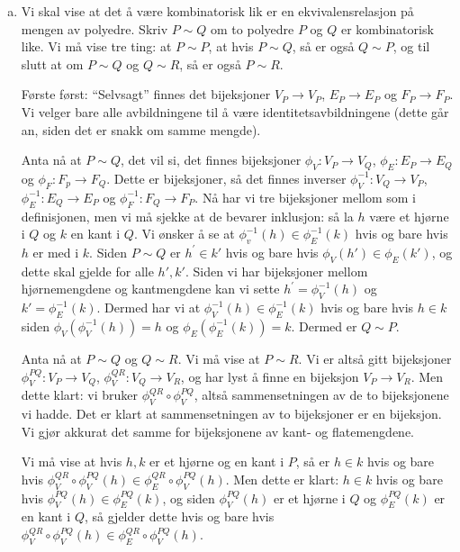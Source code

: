 \documentclass[11pt, norsk]{article}
\begin{document}
\begin{losn}
  \begin{enumerate}[a)]
  \item Vi skal vise at det å være kombinatorisk lik er en ekvivalensrelasjon på mengen av polyedre. Skriv $P \sim Q$ om to polyedre $P$ og $Q$ er kombinatorisk like. Vi må vise tre ting: at $P \sim P$, at hvis $P \sim Q$, så er også $Q \sim P$, og til slutt at om $P \sim Q$ og $Q \sim R$, så er også $P \sim R$.

Første først: ``Selvsagt'' finnes det bijeksjoner $V_P \to V_P$, $E_P \to E_P$ og $F_P \to F_P$. Vi velger bare alle avbildningene til å være identitetsavbildningene (dette går an, siden det er snakk om samme mengde).

Anta nå at $P \sim Q$, det vil si, det finnes bijeksjoner $\phi_V:V_P \to V_Q$, $\phi_E:E_P \to E_Q$ og $\phi_F:F_p \to F_Q$. Dette er bijeksjoner, så det finnes inverser $\phi_V^{-1}:V_Q \to V_P$, $\phi_E^{-1}:E_Q \to E_P$ og $\phi_F^{-1}:F_Q \to F_P$. Nå har vi tre bijeksjoner mellom som i definisjonen, men vi må sjekke at de bevarer inklusjon: så la $h$ være et hjørne i $Q$ og $k$ en kant i $Q$. Vi ønsker å se at $\phi_v^{-1}(h) \in \phi_E^{-1}(k)$ hvis og bare hvis $h$ er med i $k$. Siden $P \sim Q$ er $h^\prime \in k'$ hvis og bare hvis $\phi_V(h') \in \phi_E(k')$, og dette skal gjelde for alle $h',k'$. Siden vi har bijeksjoner mellom hjørnemengdene og kantmengdene kan vi sette $h^\prime = \phi_V^{-1}(h)$ og $k' = \phi_E^{-1}(k)$. Dermed har vi at $\phi_V^{-1}(h) \in \phi_E^{-1}(k)$ hvis og bare hvis $h \in k$ siden $\phi_V(\phi_V^{-1}(h))=h$ og $\phi_E(\phi_E^{-1}(k))=k$. Dermed er $Q \sim P$.

Anta nå at $P \sim Q$ og $Q \sim R$. Vi må vise at $P \sim R$. Vi er altså gitt bijeksjoner $\phi_V^{PQ}:V_P \to V_Q$, $\phi_V^{QR}:V_Q \to V_R$, og har lyst å finne en bijeksjon $V_P \to V_R$. Men dette klart: vi bruker $\phi_V^{QR} \circ \phi_V^{PQ}$, altså sammensetningen av de to bijeksjonene vi hadde. Det er klart at sammensetningen av to bijeksjoner er en bijeksjon. Vi gjør akkurat det samme for bijeksjonene av kant- og flatemengdene.

Vi må vise at hvis $h,k$ er et hjørne og en kant i $P$, så er $h \in k$ hvis og bare hvis $\phi_V^{QR} \circ \phi_V^{PQ}(h) \in \phi_E^{QR} \circ \phi_V^{PQ}(h)$. Men dette er klart: $h \in k$ hvis og bare hvis $\phi_V^{PQ}(h) \in \phi_E^{PQ}(k)$, og siden $\phi_V^{PQ}(h)$ er et hjørne i $Q$ og $\phi_E^{PQ}(k)$ er en kant i $Q$, så gjelder dette hvis og bare hvis $\phi_V^{QR} \circ \phi_V^{PQ}(h) \in \phi_E^{QR} \circ \phi_V^{PQ}(h)$.



\end{enumerate}
\end{losn}
\end{document}
